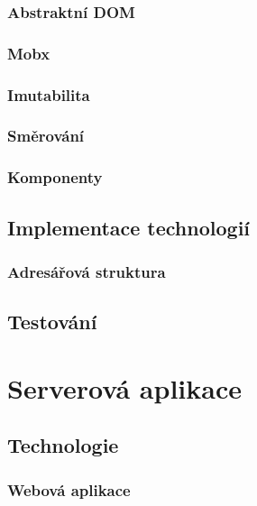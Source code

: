 \documentclass[a4paper,11pt,titlepage,fleqn]{article}
\begin{document}
        \subsubsection{Abstraktní DOM}
        \subsubsection{Mobx}
        \subsubsection{Imutabilita}
        \subsubsection{Směrování}
        \subsubsection{Komponenty}


    \subsection{Implementace technologií}

        \subsubsection{Adresářová struktura}
        

    \subsection{Testování}


\newpage
\section{Serverová aplikace}
    
    \subsection{Technologie}
        \subsubsection{Webová aplikace}
\end{document}
